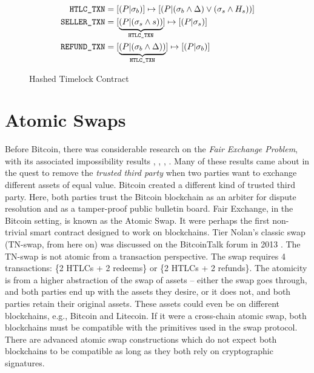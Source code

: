 \begin{figure}[!htb!]
    \centering
    \caption{Hashed Timelock Contract}
    \label{fig:htlc_txn}
\begin{align*}
    \texttt{HTLC\_TXN}{} &= [(P|\sigma_b)] \mapsto [(P|(\sigma_b \land \Delta) \lor (\sigma_s \land H_{s}))] \\
    \texttt{SELLER\_TXN}{} &= [\underbrace{(P|(\sigma_s \land s))}_{\texttt{HTLC\_TXN}{}}] \mapsto [(P|\sigma_s)] \\
    \texttt{REFUND\_TXN}{} &= [\underbrace{(P|(\sigma_b\land \Delta))}_{\texttt{HTLC\_TXN}{}}] \mapsto [(P|\sigma_b)]
\end{align*}
\end{figure}


\section{Atomic Swaps}
\label{chap:background:atomic_swaps}
Before Bitcoin, there was considerable research on the \textit{Fair Exchange Problem}, with its associated impossibility results \cite{cleve1986limits}, \cite{fair_exchange_impossibility}, \cite{franklin1997fair}, \cite{asokan1998optimistic}. Many of these results came about in the quest to remove the \textit{trusted third party} when two parties want to exchange different assets of equal value. Bitcoin created a different kind of trusted third party. Here, both parties trust the Bitcoin blockchain as an arbiter for dispute resolution and as a tamper-proof public bulletin board. Fair Exchange, in the Bitcoin setting, is known as the Atomic Swap. It were perhaps the first non-trivial smart contract designed to work on blockchains. Tier Nolan's classic swap (TN-swap, from here on) was discussed on the BitcoinTalk forum in 2013 \cite{atomic_swap}. The TN-swap is not atomic from a transaction perspective. The swap requires 4 transactions: \{2 HTLCs + 2 redeems\} or \{2 HTLCs + 2 refunds\}. The atomicity is from a higher abstraction of the swap of assets -- either the swap goes through, and both parties end up with the assets they desire, or it does not, and both parties retain their original assets. These assets could even be on different blockchains, e.g., Bitcoin and Litecoin. If it were a cross-chain atomic swap, both blockchains must be compatible with the primitives used in the swap protocol. There are advanced atomic swap constructions \cite{stealth_atomic_swaps} which do not expect both blockchains to be compatible as long as they both rely on cryptographic signatures.

